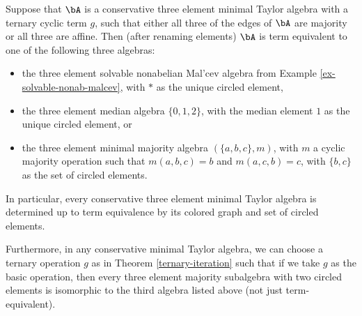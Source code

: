\begin{thm} Suppose that $\bA$ is a conservative three element minimal Taylor algebra with a ternary cyclic term $g$, such that either all three of the edges of $\bA$ are majority or all three are affine. Then (after renaming elements) $\bA$ is term equivalent to one of the following three algebras:
\begin{itemize}
\item the three element solvable nonabelian Mal'cev algebra from Example \ref{ex-solvable-nonab-malcev}, with $*$ as the unique circled element,
\item the three element median algebra $\{0,1,2\}$, with the median element $1$ as the unique circled element, or
\item the three element minimal majority algebra $(\{a,b,c\}, m)$, with $m$ a cyclic majority operation such that $m(a,b,c) = b$ and $m(a,c,b) = c$, with $\{b,c\}$ as the set of circled elements.
\end{itemize}
In particular, every conservative three element minimal Taylor algebra is determined up to term equivalence by its colored graph and set of circled elements.

Furthermore, in any conservative minimal Taylor algebra, we can choose a ternary operation $g$ as in Theorem \ref{ternary-iteration} such that if we take $g$ as the basic operation, then every three element majority subalgebra with two circled elements is isomorphic to the third algebra listed above (not just term-equivalent).
\end{thm}
